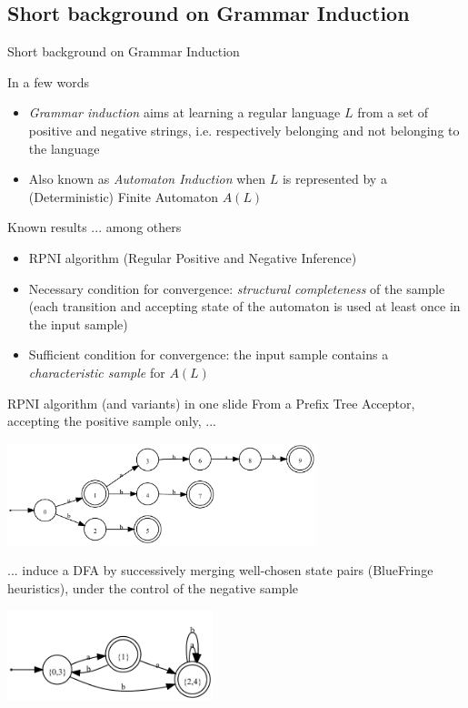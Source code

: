 \documentclass[11pt]{beamer}
\begin{document}
\subsection{Short background on Grammar Induction}
\begin{frame}{Short background on Grammar Induction}
	\begin{block}{In a few words}
		\begin{itemize}
		 	\item \emph{Grammar induction} aims at learning a regular language $L$ from a set of positive and negative strings,
				 i.e. respectively belonging and not belonging to the language
			\item Also known as \emph{Automaton Induction} when $L$ is represented by a (Deterministic) Finite Automaton $A(L)$
		\end{itemize}
	\end{block}
	\begin{block}{Known results ... among others}
		\begin{itemize}
			\item RPNI algorithm (Regular Positive and Negative Inference)
			\item Necessary condition for convergence: \emph{structural completeness} of the sample (each transition and accepting state 
				of the automaton is used at least once in the input sample)
			\item Sufficient condition for convergence: the input sample contains a \emph{characteristic sample} for $A(L)$
		\end{itemize}
	\end{block}
\end{frame}

\begin{frame}{RPNI algorithm (and variants) in one slide}
	From a Prefix Tree Acceptor, accepting the positive sample only, ...
	\begin{center}
		\includegraphics[width=9cm]{dfa_merge_0.pdf}
	\end{center}
	... induce a DFA by successively merging well-chosen state pairs (BlueFringe heuristics), under the control of the negative sample
	\begin{center}
		\includegraphics[width=6cm]{dfa_merge_3.pdf}
	\end{center}
\end{frame}
\end{document}
